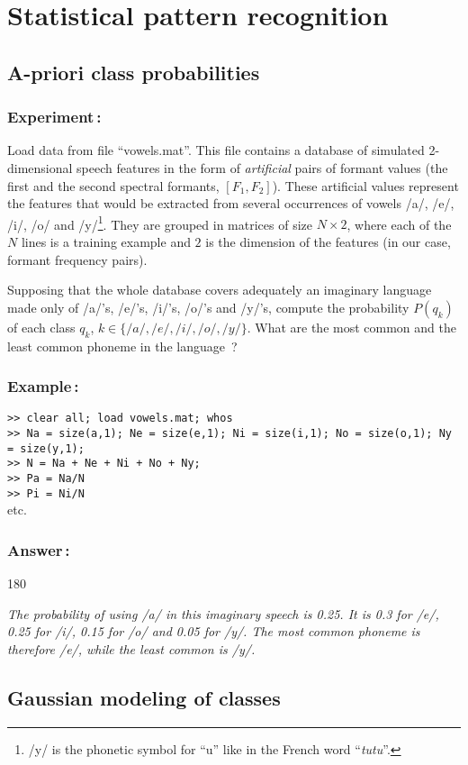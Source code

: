 \documentclass[twoside,a4paper,titlepage]{article}
\newcommand{\mat}[1]{{\tt >> #1} \\}
\newcommand{\expl}[1]{%
\begin{turn}{180}%
\parbox{\textwidth}{\em #1}%
\end{turn}%
}
\begin{document}
\section{Statistical pattern recognition}

\subsection{A-priori class probabilities}
\label{sub:apriori}
\subsubsection*{Experiment\,:}
Load data from file ``vowels.mat''. This file contains a database of
simulated 2-dimensional speech features in the form of {\em artificial}
pairs of formant values (the first and the second spectral formants,
$[F_1,F_2]$). These artificial values represent the features that would be
extracted from several occurrences of vowels /a/, /e/, /i/, /o/ and
/y/\footnote{/y/ is the phonetic symbol for ``u'' like in the French word
``{\it tutu}''.}.  They are grouped in matrices of size $N\times2$, where
each of the $N$ lines is a training example and $2$ is the dimension of the
features (in our case, formant frequency pairs).

Supposing that the whole database covers adequately an imaginary language
made only of /a/'s, /e/'s, /i/'s, /o/'s and /y/'s, compute the probability
$P(q_k)$ of each class $q_k$, $k \in \{/a/,/e/,/i/,/o/,/y/\}$. What are the
most common and the least common phoneme in the language~?

\subsubsection*{Example\,:}
\mat{clear all; load vowels.mat; whos}
\mat{Na = size(a,1); Ne = size(e,1); Ni = size(i,1); No = size(o,1); Ny = size(y,1);}
\mat{N = Na + Ne + Ni + No + Ny;}
\mat{Pa = Na/N}
\mat{Pi = Ni/N}
etc.


\subsubsection*{Answer\,:}
\expl{The probability of using /a/ in this imaginary speech is 0.25.  It is
0.3 for /e/, 0.25 for /i/, 0.15 for /o/ and 0.05 for /y/. The most common
phoneme is therefore /e/, while the least common is /y/.}


\subsection{Gaussian modeling of classes}
\label{gaussmod}
\end{document}
